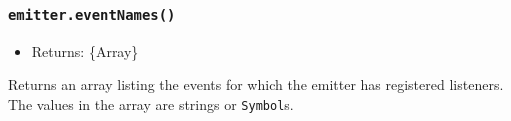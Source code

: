 \begin{Shaded}
\begin{Highlighting}[]
\NormalTok{(}\NormalTok{))}\OperatorTok{;}

\NormalTok{(}\OperatorTok{,} \OperatorTok{,} \OperatorTok{,} \OperatorTok{,} \OperatorTok{,} \NormalTok{)}\OperatorTok{;}

\CommentTok{// [}
\CommentTok{// ]}
\end{Highlighting}
\end{Shaded}

\subsubsection{\texorpdfstring{\texttt{emitter.eventNames()}}{emitter.eventNames()}}\label{emitter.eventnames}

\begin{itemize}
\tightlist
\item
  Returns: \{Array\}
\end{itemize}

Returns an array listing the events for which the emitter has registered
listeners. The values in the array are strings or \texttt{Symbol}s.

